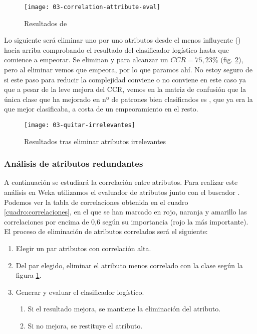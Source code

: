 \begin{figure}[H]
    \centering
    \texttt{[image: 03-correlation-attribute-eval]}
    \caption{Resultados de }
    \label{fig:correlation-attribute-eval}
\end{figure}

Lo siguiente será eliminar uno por uno atributos desde el menos influyente () hacia arriba comprobando el resultado del clasificador logístico hasta que comience a empeorar. Se eliminan  y  para alcanzar un $CCR=75,23\%$ (fig. \ref{fig:03-quitar-irrelevantes}), pero al eliminar  vemos que empeora, por lo que paramos ahí. No estoy seguro de si este paso para reducir la complejidad conviene o no conviene en este caso ya que a pesar de la leve mejora del CCR, vemos en la matriz de confusión que la única clase que ha mejorado en nº de patrones bien clasificados es , que ya era la que mejor clasificaba, a costa de un empeoramiento en el resto. 

\begin{figure}[ht]
    \centering
    \texttt{[image: 03-quitar-irrelevantes]}
    \caption{Resultados tras eliminar atributos irrelevantes}
    \label{fig:03-quitar-irrelevantes}
\end{figure}


\subsubsection{Análisis de atributos redundantes}
A continuación se estudiará la correlación entre atributos. Para realizar este análisis en Weka utilizamos el evaluador de atributos  junto con el buscador . Podemos ver la tabla de correlaciones obtenida en el cuadro \ref{cuadro:correlaciones}, en el que se han marcado en rojo, naranja y amarillo las correlaciones por encima de 0,6 según su importancia (rojo la más importante). El proceso de eliminación de atributos correlados será el siguiente:
\begin{enumerate}
    \item Elegir un par atributos con correlación alta.
    \item Del par elegido, eliminar el atributo menos correlado con la clase según la figura \ref{fig:correlation-attribute-eval}.
    \item Generar y evaluar el clasificador logístico.
    \begin{enumerate}
        \item Si el resultado mejora, se mantiene la eliminación del atributo.
        \item Si no mejora, se restituye el atributo.
    \end{enumerate}
\end{enumerate}

